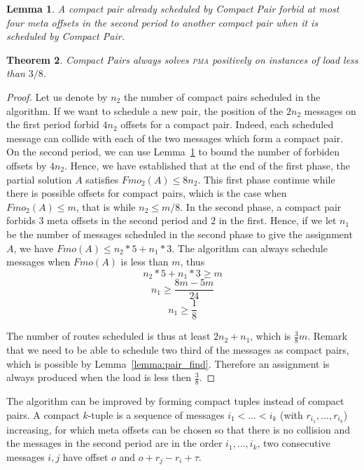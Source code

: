 \documentclass[10pt, conference, letterpaper]{IEEEtran}
\newtheorem{theorem}{Theorem}
\newtheorem{lemma}[theorem]{Lemma}
\newcommand\pma{\textsc{pma}\xspace}
\begin{document}
\begin{lemma}\label{lemma:pair_forbid}
A compact pair already scheduled by Compact Pair forbid at most four meta offsets in the second period to another compact pair when it is scheduled by Compact Pair.
\end{lemma}

\begin{theorem}
Compact Pairs always solves \pma positively on instances of load less than
$3/8$.
\end{theorem}
\begin{proof}
Let us denote by $n_2$ the number of compact pairs scheduled in the algorithm.
If we want to schedule a new pair, the position of the $2n_2$ messages on the first
period forbid $4n_2$ offsets for a compact pair. Indeed, each scheduled message can collide
with each of the two messages which form a compact pair. On the second period, we can use Lemma~\ref{lemma:pair_forbid} to bound the number of forbiden offsets by $4n_2$. 
Hence, we have established that at the end of the first phase, the partial solution $A$
satisfies $Fmo_2(A) \leq 8n_2$. This first phase continue while there is possible offsets for compact pairs, which is the case when $Fmo_2(A) \leq m$, that is while $n_2 \leq m/8$.
In the second phase, a compact pair forbids $3$ meta offsets in the 
second period and $2$ in the first. Hence, if we let $n_1$ be the number of messages scheduled in the second phase to give the assignment $A$, we have $Fmo(A) \leq n_2*5 + n_1*3$. 
The algorithm can always schedule messages when $Fmo(A)$ is less than $m$, thus
$$ n_2*5 + n_1*3 \geq m$$
$$ n_1 \geq \frac{8m - 5m }{24}$$
$$n_1 \geq \frac{1}{8}$$

The number of routes scheduled is thus at least $2n_2 + n_1$,
which is $\frac{3}{8}m$. Remark that we need to be able to schedule two third of the messages as compact pairs, which is possible by Lemma~\ref{lemma:pair_find}. Therefore an assignment is always produced when the load is less then $\frac{3}{8}$.
\end{proof}

The algorithm can be improved by forming compact tuples instead of compact pairs.
A compact $k$-tuple is a sequence of messages $i_1 < \dots < i_k$ (with $r_{i_1},\dots,r_{i_k}$)  increasing, for which meta offsets can be chosen so that there is no collision and
the messages in the second period are in the order $i_1,\dots,i_k$, two consecutive messages $i,j$ have offset $o$ and $o + r_j -r_i + \tau$.
\end{document}
